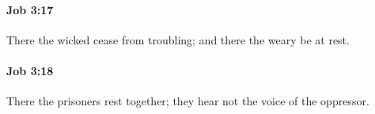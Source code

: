 		\paragraph{Job 3:17} %
			\label{JOB-3-17}

			There the wicked cease from troubling; and there the weary be at rest.


		\paragraph{Job 3:18} %
			\label{JOB-3-18}

			There the prisoners rest together; they hear not the voice of the oppressor.


